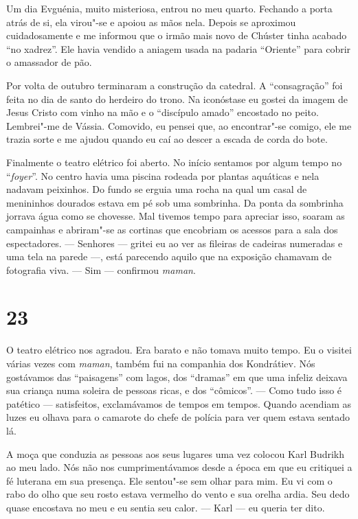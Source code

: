Um dia Evguénia, muito misteriosa, entrou no meu quarto. Fechando a
porta atrás de si, ela virou"-se e apoiou as mãos nela. Depois se
aproximou cuidadosamente e me informou que o irmão mais novo de Chúster
tinha acabado ``no xadrez''. Ele havia vendido a aniagem usada na
padaria ``Oriente'' para cobrir o amassador de pão.

Por volta de outubro terminaram a construção da catedral. A
``consagração'' foi feita no dia de santo do herdeiro do trono. Na
iconóstase eu gostei da imagem de Jesus Cristo com vinho na mão e o
``discípulo amado'' encostado no peito. Lembrei"-me de Vássia. Comovido,
eu pensei que, ao encontrar"-se comigo, ele me trazia sorte e me ajudou
quando eu caí ao descer a escada de corda do bote.

Finalmente o teatro elétrico foi aberto. No início sentamos por algum
tempo no ``\emph{foyer}''. No centro havia uma piscina rodeada por
plantas aquáticas e nela nadavam peixinhos. Do fundo se erguia uma rocha
na qual um casal de menininhos dourados estava em pé sob uma sombrinha.
Da ponta da sombrinha jorrava água como se chovesse. Mal tivemos tempo
para apreciar isso, soaram as campainhas e abriram"-se as cortinas que
encobriam os acessos para a sala dos espectadores. --- Senhores ---
gritei eu ao ver as fileiras de cadeiras numeradas e uma tela na parede
---, está parecendo aquilo que na exposição chamavam de fotografia viva.
--- Sim --- confirmou \emph{maman}.

\section{23}

O teatro elétrico nos agradou. Era barato e não tomava muito tempo. Eu o
visitei várias vezes com \emph{maman}, também fui na companhia dos
Kondrátiev. Nós gostávamos das ``paisagens'' com lagos, dos ``dramas''
em que uma infeliz deixava sua criança numa soleira de pessoas ricas, e
dos ``cômicos''. --- Como tudo isso é patético --- satisfeitos,
exclamávamos de tempos em tempos. Quando acendiam as luzes eu olhava
para o camarote do chefe de polícia para ver quem estava sentado lá.

A moça que conduzia as pessoas aos seus lugares uma vez colocou Karl
Budrikh ao meu lado. Nós não nos cumprimentávamos desde a época em que
eu critiquei a fé luterana em sua presença. Ele sentou"-se sem olhar para
mim. Eu vi com o rabo do olho que seu rosto estava vermelho do vento e
sua orelha ardia. Seu dedo quase encostava no meu e eu sentia seu calor.
--- Karl --- eu queria ter dito.

